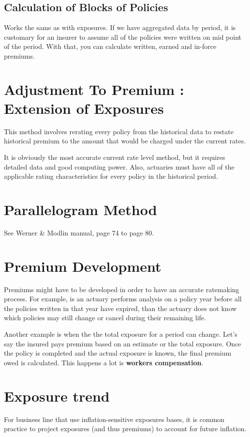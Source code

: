 \documentclass[11pt, english]{memoir}
\numberwithin{definition}{section}
\begin{document}
	\subsection{Calculation of Blocks of Policies}
	Works the same as with exposures. If we have aggregated data by period, it is customary for an insurer to assume all of the policies were written on mid point of the period. With that, you can calculate written, earned and in-force premiums. 
	
	
	\section{Adjustment To Premium : Extension of Exposures}
	This method involves rerating every policy from the historical data to restate historical premium to the amount that would be charged under the current rates. 
	
	It is obviously the most accurate current rate level method, but it requires detailed data and good computing power. Also, actuaries must have all of the applicable rating characteristics for every policy in the historical period. 
	
	\section{Parallelogram Method}
	See Werner \& Modlin manual, page 74 to page 80. 
	
	\section{Premium Development}
	Premiums might have to be developed in order to have an accurate ratemaking process. For example, is an actuary performs analysis on a policy year before all the policies written in that year have expired, than the actuary does not know which policies may still change or cancel during their remaining life. 
	
	Another example is when the the total exposure for a period can change. Let's say the insured pays premium based on an estimate or the total exposure. Once the policy is completed and the actual exposure is known, the final premium owed is calculated. This happens a lot is \textbf{workers compensation}. 
	
	\section{Exposure trend}
	For business line that use inflation-sensitive exposures bases, it is common practice to project exposures (and thus premiums) to account for future inflation. 
	
\end{document}
